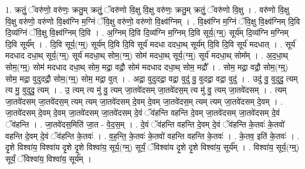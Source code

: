 \documentclass[17pt]{extarticle}
\begin{document}
1. क्रतुं॒ ॅवरु॑णो॒ वरु॑णः॒ क्रतु॒म् क्रतुं॒ ॅवरु॑णो वि॒क्षु वि॒क्षु वरु॑णः॒ क्रतु॒म् क्रतुं॒ ॅवरु॑णो वि॒क्षु । . वरु॑णो वि॒क्षु वि॒क्षु वरु॑णो॒ वरु॑णो वि॒क्ष्व॑ग्नि म॒ग्निं ॅवि॒क्षु वरु॑णो॒ वरु॑णो वि॒क्ष्व॑ग्निम् । . वि॒क्ष्व॑ग्नि म॒ग्निं ॅवि॒क्षु वि॒क्ष्व॑ग्निम् दि॒वि दि॒व्य॑ग्निं ॅवि॒क्षु वि॒क्ष्व॑ग्निम् दि॒वि । . अ॒ग्निम् दि॒वि दि॒व्य॑ग्नि म॒ग्निम् दि॒वि सूर्य॒(ग्म्॒) सूर्य॑म् दि॒व्य॑ग्नि म॒ग्निम् दि॒वि सूर्य᳚म् । . दि॒वि सूर्य॒(ग्म्॒) सूर्य॑म् दि॒वि दि॒वि सूर्य॑ मदधा ददधा॒थ् सूर्य॑म् दि॒वि दि॒वि सूर्य॑ मदधात् । . सूर्य॑ मदधाद दधा॒थ् सूर्य॒(ग्म्॒) सूर्य॑ मदधा॒थ् सोम॒(ग्म्॒) सोम॑ मदधा॒थ् सूर्य॒(ग्म्॒) सूर्य॑ मदधा॒थ् सोम᳚म् । . अ॒द॒धा॒थ् सोम॒(ग्म्॒) सोम॑ मदधाद दधा॒थ् सोम॒ मद्रा॒ वद्रौ॒ सोम॑ मदधाद दधा॒थ् सोम॒ मद्रौ᳚ । . सोम॒ मद्रा॒ वद्रौ॒ सोम॒(ग्म्॒) सोम॒ मद्रा॒ वुदुदद्रौ॒ सोम॒(ग्म्॒) सोम॒ मद्रा॒ वुत् । . अद्रा॒ वुदुदद्रा॒ वद्रा॒ वुदु॑ वु॒ वुदद्रा॒ वद्रा॒ वुदु॑ । . उदु॑ वु॒ वुदुदु॒ त्यम् त्य मु॒ वुदुदु॒ त्यम् । . उ॒ त्यम् त्य मु॑ वु॒ त्यम् जा॒तवे॑दसम् जा॒तवे॑दस॒म् त्य मु॑ वु॒ त्यम् जा॒तवे॑दसम् । . त्यम् जा॒तवे॑दसम् जा॒तवे॑दस॒म् त्यम् त्यम् जा॒तवे॑दसम् दे॒वम् दे॒वम् जा॒तवे॑दस॒म् त्यम् त्यम् जा॒तवे॑दसम् दे॒वम् । . जा॒तवे॑दसम् दे॒वम् दे॒वम् जा॒तवे॑दसम् जा॒तवे॑दसम् दे॒वं ॅव॑हन्ति वहन्ति दे॒वम् जा॒तवे॑दसम् जा॒तवे॑दसम् दे॒वं ॅव॑हन्ति । . जा॒तवे॑दस॒मिति॑ जा॒त - वे॒द॒स॒म् । . दे॒वं ॅव॑हन्ति वहन्ति दे॒वम् दे॒वं ॅव॑हन्ति के॒तवः॑ के॒तवो॑ वहन्ति दे॒वम् दे॒वं ॅव॑हन्ति के॒तवः॑ । . व॒ह॒न्ति॒ के॒तवः॑ के॒तवो॑ वहन्ति वहन्ति के॒तवः॑ । . के॒तव॒ इति॑ के॒तवः॑ । . दृ॒शे विश्वा॑य॒ विश्वा॑य दृ॒शे दृ॒शे विश्वा॑य॒ सूर्य॒(ग्म्॒) सूर्यं॒ ॅविश्वा॑य दृ॒शे दृ॒शे विश्वा॑य॒ सूर्य᳚म् । . विश्वा॑य॒ सूर्य॒(ग्म्॒) सूर्यं॒ ॅविश्वा॑य॒ विश्वा॑य॒ सूर्य᳚म् । \newline
\end{document}
